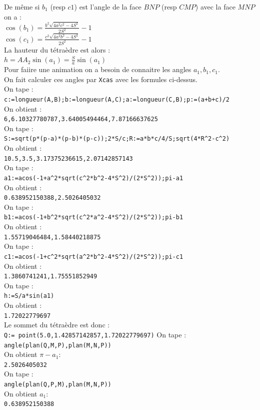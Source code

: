 \documentclass[a4paper,11pt]{book}
\begin{document}
De m\^eme si $b_1$ (resp $c1$) est l'angle de la face $BNP$ (resp $CMP$)
avec la face $MNP$ on a  :\\
$\displaystyle \cos(b_1)=\frac{b^2\sqrt{4a^2c^2-4S^2}}{2S^2}-1$\\
$\displaystyle \cos(c_1)=\frac{c^2\sqrt{4a^2b^2-4S^2}}{2S^2}-1$\\
La hauteur du t\'etra\`edre est alors : \\
$\displaystyle h=AA_2\sin(a_1)=\frac{S}{a}\sin(a_1)$\\
Pour faiire une animation on a besoin de connaitre les angles $a_1,b_1,c_1$.\\
On  fait calculer ces angles par {\tt Xcas} avec les formules ci-dessus.\\
On tape :\\
{\tt c:=longueur(A,B);b:=longueur(A,C);a:=longueur(C,B);p:=(a+b+c)/2}\\
On obtient :\\
{\tt 6,6.10327780787,3.64005494464,7.87166637625}\\
On tape :\\
{\tt S:=sqrt(p*(p-a)*(p-b)*(p-c));2*S/c;R:=a*b*c/4/S;sqrt(4*R\verb|^|2-c\verb|^|2)}\\
On obtient :\\
{\tt 10.5,3.5,3.17375236615,2.07142857143}\\
On tape :\\
{\tt a1:=acos(-1+a\verb|^|2*sqrt(c\verb|^|2*b\verb|^|2-4*S\verb|^|2)/(2*S\verb|^|2));pi-a1}\\
On obtient :\\
{\tt 0.638952150388,2.5026405032}\\
On tape :\\
{\tt b1:=acos(-1+b\verb|^|2*sqrt(c\verb|^|2*a\verb|^|2-4*S\verb|^|2)/(2*S\verb|^|2));pi-b1}\\
On obtient :\\
{\tt 1.55719046484,1.58440218875}\\
On tape :\\
{\tt c1:=acos(-1+c\verb|^|2*sqrt(a\verb|^|2*b\verb|^|2-4*S\verb|^|2)/(2*S\verb|^|2));pi-c1}\\
On obtient :\\
{\tt 1.3860741241,1.75551852949}\\
On tape :\\
{\tt h:=S/a*sin(a1)}\\
On obtient :\\
{\tt 1.72022779697}\\
Le sommet du t\'etra\`edre est donc :\\
{\tt Q:= point(5.0,1.42857142857,1.72022779697)}
On tape :\\
{\tt angle(plan(Q,M,P),plan(M,N,P))}\\
On obtient $\pi-a_1$:\\
{\tt 2.5026405032}\\
On tape :\\
{\tt angle(plan(Q,P,M),plan(M,N,P))}\\
On obtient $a_1$:\\
{\tt 0.638952150388}
\end{document}
